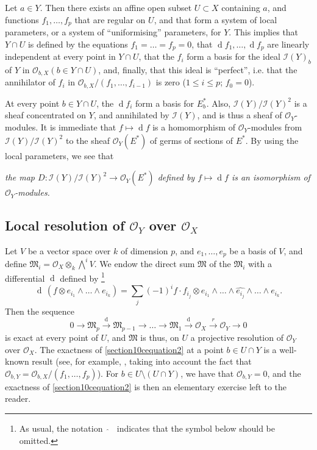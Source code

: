 \documentclass{article}
\theoremstyle{plain}
\theoremstyle{definition}
\newcommand{\sh}[1]{{\mathscr{#1}}}
\newcommand{\dd}{\operatorname{d}\!}
\renewcommand{\leq}{\leqslant}
\newcommand{\oldpage}[1]{\marginpar{\footnotesize$\Big\vert$ \textit{p.~#1}}}
\begin{document}
Let $a\in Y$.
Then there exists an affine open subset $U\subset X$ containing $a$, and functions $f_1,\ldots,f_p$ that are regular on $U$, and that form a system of local parameters, or a system of ``uniformising'' parameters, for $Y$.
This implies that $Y\cap U$ is defined by the equations $f_1=\ldots=f_p=0$, that $\dd f_1,\ldots,\dd f_p$ are linearly independent at every point in $Y\cap U$, that the $f_i$ form a basis for the ideal $\sh{I}(Y)_b$ of $Y$ in $\sh{O}_{b,X}(b\in Y\cap U)$, and, finally, that this ideal is ``perfect'', i.e. that the annihilator of $f_i$ in $\sh{O}_{b,X}/(f_1,\ldots,f_{i-1})$ is zero ($1\leq i\leq p$; $f_0=0$).

At every point $b\in Y\cap U$, the $\dd f_i$ form a basis for $E_b^*$.
Also, $\sh{I}(Y)/\sh{I}(Y)^2$ is a sheaf concentrated on $Y$, and annihilated by $\sh{I}(Y)$, and is thus a sheaf of $\sh{O}_Y$-modules.
It is immediate that $f\mapsto\dd f$ is a homomorphism of $\sh{O}_Y$-modules from $\sh{I}(Y)/\sh{I}(Y)^2$ to the sheaf $\sh{O}_Y(E^*)$ of germs of sections of $E^*$.
By using the local parameters, we see that

\medskip

\emph{the map $D\colon\sh{I}(Y)/\sh{I}(Y)^2 \to \sh{O}_Y(E^*)$ defined by $f\mapsto\dd f$ is an isomorphism of $\sh{O}_Y$-modules.}


\subsection{Local resolution of \texorpdfstring{$\sh{O}_Y$}{O_Y} over \texorpdfstring{$\sh{O}_X$}{O_X}}
\label{subsection10c}

Let $V$ be a vector space over $k$ of dimension $p$, and $e_1,\ldots,e_p$ be a basis of $V$, and define $\mathfrak{M}_i = \sh{O}_X\otimes_k\bigwedge\nolimits^i V$.
We endow the direct sum $\mathfrak{M}$ of the $\mathfrak{M}_i$ with a differential $\dd$ defined by
\footnote{As usual, the notation $\,\,\widehat{\,}\,\,\,$ indicates that the symbol below should be omitted.}
\[
  \dd\,(f\otimes e_{i_1}\wedge\ldots\wedge e_{i_k})
  = \sum_j (-1)^i f\cdot f_{i_j}\otimes e_{i_1}\wedge\ldots\wedge \widehat{e_{i_j}} \wedge\ldots\wedge e_{i_k}.
\]
Then the sequence
\[
\label{section10cequation2}
  0 \to \mathfrak{M}_p \xrightarrow{\mathrm{d}} \mathfrak{M}_{p-1} \to \ldots \to \mathfrak{M}_1 \xrightarrow{\mathrm{d}} \sh{O}_X \xrightarrow{r} \sh{O}_Y \to 0
  \tag{2}
\]
is exact at every point of $U$, and $\mathfrak{M}$ is thus, on $U$ a
\oldpage{121}
projective resolution of $\sh{O}_Y$ over $\sh{O}_X$.
The exactness of \cref{section10cequation2} at a point $b\in U\cap Y$ is a well-known result (see, for example, \cite[proposition~4.3, p.~151]{3}, taking into account the fact that $\sh{O}_{b,Y}=\sh{O}_{b,X}/(f_1,\ldots,f_p)$).
For $b\in U\setminus(U\cap Y)$, we have that $\sh{O}_{b,Y}=0$, and the exactness of \cref{section10cequation2} is then an elementary exercise left to the reader.
\end{document}
